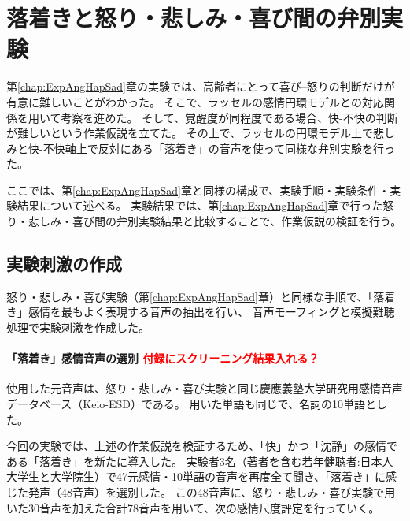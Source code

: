 \newpage
\chapter{落着きと怒り・悲しみ・喜び間の弁別実験}
\label{chap:ExpCalm}
第\ref{chap:ExpAngHapSad}章の実験では、高齢者にとって喜び--怒りの判断だけが有意に難しいことがわかった。
そこで、ラッセルの感情円環モデル\cite{russell1980circumplex}との対応関係を用いて考察を進めた。
そして、覚醒度が同程度である場合、快-不快の判断が難しいという作業仮説を立てた。
その上で、ラッセルの円環モデル上で悲しみと快-不快軸上で反対にある「落着き」の音声を使って同様な弁別実験を行った。

ここでは、第\ref{chap:ExpAngHapSad}章と同様の構成で、実験手順・実験条件・実験結果について述べる。
実験結果では、第\ref{chap:ExpAngHapSad}章で行った怒り・悲しみ・喜び間の弁別実験結果と比較することで、作業仮説の検証を行う。

\section{実験刺激の作成}
怒り・悲しみ・喜び実験（第\ref{chap:ExpAngHapSad}章）と同様な手順で、「落着き」感情を最もよく表現する音声の抽出を行い、
音声モーフィングと模擬難聴処理で実験刺激を作成した。

\subsubsection{「落着き」感情音声の選別 \textcolor{red}{付録にスクリーニング結果入れる？}}
使用した元音声は、怒り・悲しみ・喜び実験と同じ慶應義塾大学研究用感情音声データベース（Keio-ESD）\cite{keioESD-J}である。
用いた単語も同じで、名詞の10単語とした。

今回の実験では、上述の作業仮説を検証するため、「快」かつ「沈静」の感情である「落着き」を新たに導入した。
実験者3名（著者を含む若年健聴者:日本人大学生と大学院生）で47元感情・10単語の音声を再度全て聞き、「落着き」に感じた発声（48音声）を選別した。
この48音声に、怒り・悲しみ・喜び実験で用いた30音声を加えた合計78音声を用いて、次の感情尺度評定を行っていく。



